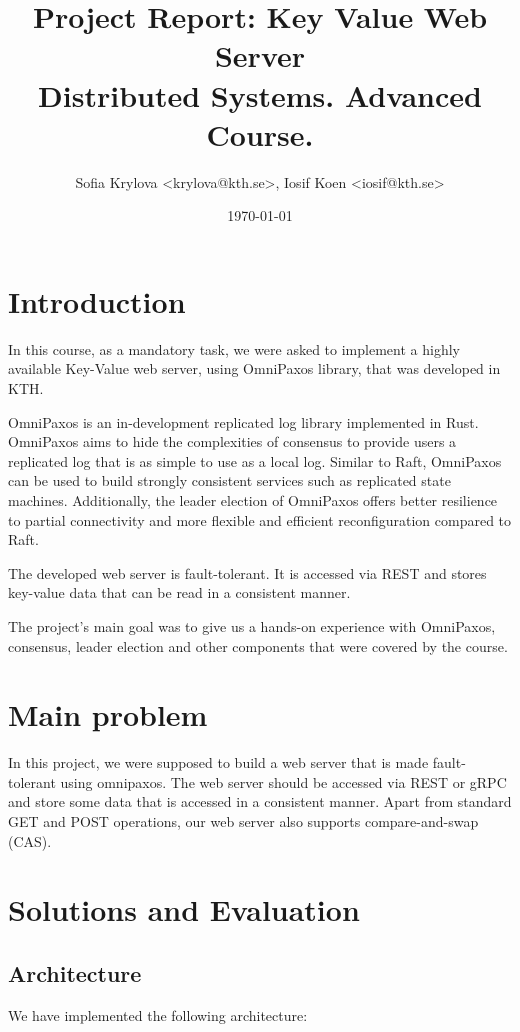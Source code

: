 \documentclass[a4paper, 11pt]{article}
\title{%
Project Report: Key Value Web Server \\
\large Distributed Systems. Advanced Course.}
\author{Sofia Krylova <krylova@kth.se>, Iosif Koen <iosif@kth.se>}
\date{\today{}}
\begin{document}
\maketitle

\section{Introduction}
In this course, as a mandatory task, we were asked to implement a highly available Key-Value web server, using OmniPaxos library, that was developed in KTH. 

OmniPaxos is an in-development replicated log library implemented in Rust. OmniPaxos aims to hide the complexities of consensus to provide users a replicated log that is as simple to use as a local log. Similar to Raft, OmniPaxos can be used to build strongly consistent services such as replicated state machines. Additionally, the leader election of OmniPaxos offers better resilience to partial connectivity and more flexible and efficient reconfiguration compared to Raft.

The developed web server is fault-tolerant. It is accessed via REST and stores key-value data that can be read in a consistent manner. 

The project's main goal was to give us a hands-on experience with OmniPaxos, consensus, leader election and other components that were covered by the course. 
\section{Main problem}

In this project, we were supposed to build a web server that is made fault-tolerant using omnipaxos.
The web server should be accessed via REST or gRPC and store some data that is
accessed in a consistent manner. Apart from standard GET and POST operations, our web server also supports compare-and-swap (CAS).

\section{Solutions and Evaluation}
\subsection{Architecture}

We have implemented the following architecture:
\end{document}
